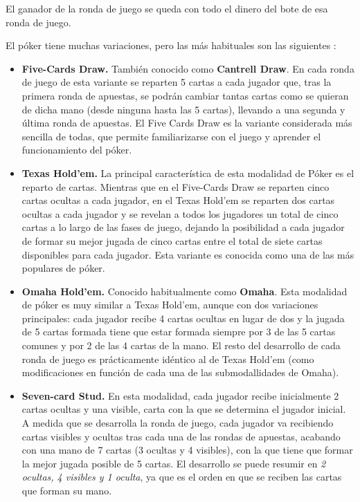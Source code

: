 El ganador de la ronda de juego se queda con todo el dinero del bote de esa ronda de juego.

El póker tiene muchas variaciones, pero las más habituales son las siguientes\cite{pokertypes, howto} :

\begin{itemize}
\item \textbf{Five-Cards Draw.} También conocido como \textbf{Cantrell Draw}. En cada ronda de juego de esta variante se reparten 5 cartas a cada jugador que, tras la primera ronda de apuestas, se podrán cambiar tantas cartas como se quieran de dicha mano (desde ninguna hasta las 5 cartas), llevando a una segunda y última ronda de apuestas. El Five Cards Draw es la variante considerada más sencilla de todas, que permite familiarizarse con el juego y aprender el funcionamiento del póker.
\item \textbf{Texas Hold'em.} La principal característica de esta modalidad de Póker es el reparto de cartas. Mientras que en el Five-Cards Draw se reparten cinco cartas ocultas a cada jugador, en el Texas Hold’em se reparten dos cartas ocultas a cada jugador y se revelan a todos los jugadores un total de cinco cartas a lo largo de las fases de juego, dejando la posibilidad a cada jugador de formar su mejor jugada de cinco cartas entre el total de siete cartas disponibles para cada jugador. Esta variante es conocida como una de las más populares de póker.
\item \textbf{Omaha Hold'em.} Conocido habitualmente como \textbf{Omaha}. Esta modalidad de póker es muy similar a Texas Hold'em, aunque con dos variaciones principales: cada jugador recibe 4 cartas ocultas en lugar de dos y la jugada de 5 cartas formada tiene que estar formada siempre por 3 de las 5 cartas comunes y por 2 de las 4 cartas de la mano. El resto del desarrollo de cada ronda de juego es prácticamente idéntico al de Texas Hold'em (como modificaciones en función de cada una de las submodallidades de Omaha).
\item \textbf{Seven-card Stud.} En esta modalidad, cada jugador recibe inicialmente 2 cartas ocultas y una visible, carta con la que se determina el jugador inicial. A medida que se desarrolla la ronda de juego, cada jugador va recibiendo cartas visibles y ocultas tras cada una de las rondas de apuestas, acabando con una mano de 7 cartas (3 ocultas y 4 visibles), con la que tiene que formar la mejor jugada posible de 5 cartas. El desarrollo se puede resumir en \textit{2 ocultas, 4 visibles y 1 oculta}, ya que es el orden en que se reciben las cartas que forman su mano.
\end{itemize}

